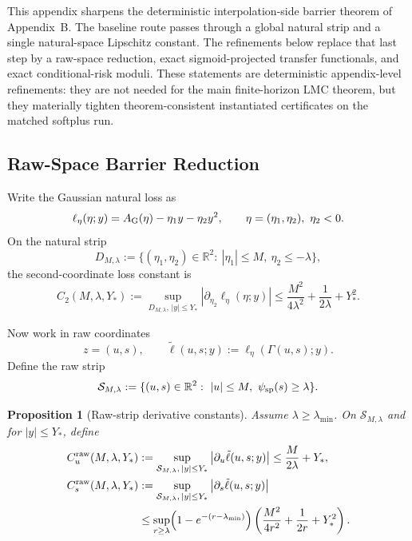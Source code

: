 \documentclass[11pt]{article}
\newtheorem{proposition}[theorem]{Proposition}
\theoremstyle{definition}
\newcommand{\R}{\mathbb{R}}
\newcommand{\abs}[1]{\left\lvert #1 \right\rvert}
\begin{document}
This appendix sharpens the deterministic interpolation-side barrier theorem of
Appendix~B. The baseline route passes through a global natural strip and a
single natural-space Lipschitz constant. The refinements below replace that
last step by a raw-space reduction, exact sigmoid-projected transfer
functionals, and exact conditional-risk moduli. These statements are
deterministic appendix-level refinements: they are not needed for the main
finite-horizon LMC theorem, but they materially tighten theorem-consistent
instantiated certificates on the matched softplus run.

\subsection{Raw-Space Barrier Reduction}

Write the Gaussian natural loss as
\[
  \ell_\eta(\eta;y)=A_{\rm G}(\eta)-\eta_1 y-\eta_2 y^2,
  \qquad
  \eta=(\eta_1,\eta_2),\ \eta_2<0.
\]
On the natural strip
\[
  D_{M,\lambda}
  :=
  \{(\eta_1,\eta_2)\in\R^2:\ |\eta_1|\le M,\ \eta_2\le-\lambda\},
\]
the second-coordinate loss constant is
\begin{equation}
  C_2(M,\lambda,Y_\ast)
  :=
  \sup_{D_{M,\lambda},\,|y|\le Y_\ast}
  \abs{\partial_{\eta_2}\ell_\eta(\eta;y)}
  \le
  \frac{M^2}{4\lambda^2}+\frac{1}{2\lambda}+Y_\ast^2.
  \label{eq:C2}
\end{equation}

Now work in raw coordinates
\[
  z=(u,s),
  \qquad
  \tilde\ell(u,s;y):=\ell_\eta(\Gamma(u,s);y).
\]
Define the raw strip
\[
  \mathcal S_{M,\lambda}
  :=
  \{(u,s)\in\R^2:\ |u|\le M,\ \psi_{\rm sp}(s)\ge \lambda\}.
\]

\begin{proposition}[Raw-strip derivative constants]
\label{prop:raw-strip-constants}
Assume $\lambda\ge \lambda_{\min}$. On $\mathcal S_{M,\lambda}$ and for
$|y|\le Y_\ast$, define
\begin{align}
  C_u^{\rm raw}(M,\lambda,Y_\ast)
  &:=
  \sup_{\mathcal S_{M,\lambda},\,|y|\le Y_\ast}
  \abs{\partial_u\tilde\ell(u,s;y)}
  \le
  \frac{M}{2\lambda}+Y_\ast,
  \label{eq:Cu-raw}
  \\
  C_s^{\rm raw}(M,\lambda,Y_\ast)
  &:=
  \sup_{\mathcal S_{M,\lambda},\,|y|\le Y_\ast}
  \abs{\partial_s\tilde\ell(u,s;y)}
  \nonumber\\
  &\le
  \sup_{r\ge \lambda}
  \Bigl(1-e^{-(r-\lambda_{\min})}\Bigr)
  \left(
    \frac{M^2}{4r^2}+\frac1{2r}+Y_\ast^2
  \right).
  \label{eq:Cs-raw}
\end{align}
\end{proposition}
\end{document}
